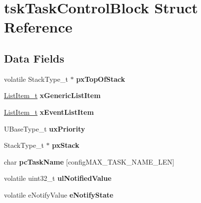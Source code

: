 \hypertarget{structtsk_task_control_block}{}\section{tsk\+Task\+Control\+Block Struct Reference}
\label{structtsk_task_control_block}
\subsection*{Data Fields}
\begin{DoxyCompactItemize}
\item 
\hypertarget{structtsk_task_control_block_a41989bc39d576125f4492364592f9e1a}{}volatile Stack\+Type\+\_\+t $\ast$ {\bfseries px\+Top\+Of\+Stack}\label{structtsk_task_control_block_a41989bc39d576125f4492364592f9e1a}

\item 
\hypertarget{structtsk_task_control_block_ad91115e6e382ba8961310c4559abc7d2}{}\hyperlink{structx_l_i_s_t___i_t_e_m}{List\+Item\+\_\+t} {\bfseries x\+Generic\+List\+Item}\label{structtsk_task_control_block_ad91115e6e382ba8961310c4559abc7d2}

\item 
\hypertarget{structtsk_task_control_block_a139605d93d834601f34be927ecba3a15}{}\hyperlink{structx_l_i_s_t___i_t_e_m}{List\+Item\+\_\+t} {\bfseries x\+Event\+List\+Item}\label{structtsk_task_control_block_a139605d93d834601f34be927ecba3a15}

\item 
\hypertarget{structtsk_task_control_block_a0befed3dd0fe55b4314158f4814f50ae}{}U\+Base\+Type\+\_\+t {\bfseries ux\+Priority}\label{structtsk_task_control_block_a0befed3dd0fe55b4314158f4814f50ae}

\item 
\hypertarget{structtsk_task_control_block_aaecd48bdf732c1df94b258956ca85bd7}{}Stack\+Type\+\_\+t $\ast$ {\bfseries px\+Stack}\label{structtsk_task_control_block_aaecd48bdf732c1df94b258956ca85bd7}

\item 
\hypertarget{structtsk_task_control_block_afa7d65deeca135b921eaa78fbbf52918}{}char {\bfseries pc\+Task\+Name} \mbox{[}config\+M\+A\+X\+\_\+\+T\+A\+S\+K\+\_\+\+N\+A\+M\+E\+\_\+\+L\+E\+N\mbox{]}\label{structtsk_task_control_block_afa7d65deeca135b921eaa78fbbf52918}

\item 
\hypertarget{structtsk_task_control_block_a99c9bfaf922e092fb6ab2ee742677b46}{}volatile uint32\+\_\+t {\bfseries ul\+Notified\+Value}\label{structtsk_task_control_block_a99c9bfaf922e092fb6ab2ee742677b46}

\item 
\hypertarget{structtsk_task_control_block_aa25e9161555a1b695e0ef8f25c7ac088}{}volatile e\+Notify\+Value {\bfseries e\+Notify\+State}\label{structtsk_task_control_block_aa25e9161555a1b695e0ef8f25c7ac088}

\end{DoxyCompactItemize}


